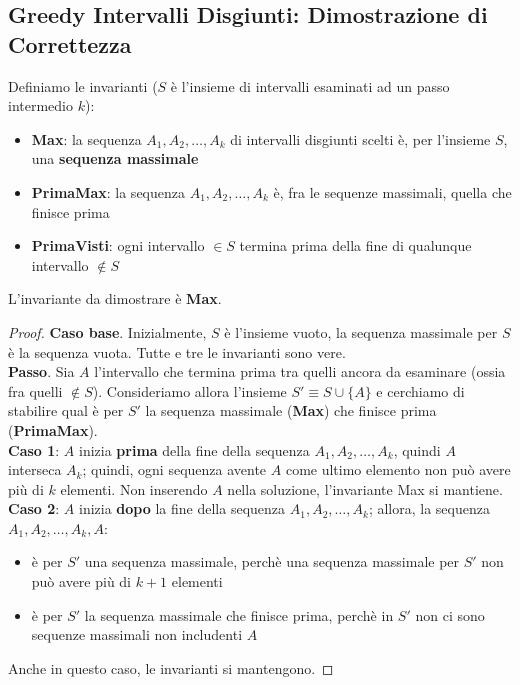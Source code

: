\documentclass[11pt]{article}
\begin{document}
\subsection*{Greedy Intervalli Disgiunti: Dimostrazione di Correttezza}
Definiamo le invarianti ($S$ è l'insieme di intervalli esaminati ad un passo intermedio $k$): 
\begin{itemize}
    \item \textbf{Max}: la sequenza $A_1,A_2,\dots,A_k$ di intervalli disgiunti scelti è, per l'insieme $S$, una \textbf{sequenza massimale}
    \item \textbf{PrimaMax}: la sequenza $A_1,A_2,\dots,A_k$ è, fra le sequenze massimali, quella che finisce prima 
    \item \textbf{PrimaVisti}: ogni intervallo $\in S$ termina prima della fine di qualunque intervallo $\notin S$
\end{itemize}
L'invariante da dimostrare è \textbf{Max}.
\begin{proof}
    \textbf{Caso base}. Inizialmente, $S$ è l'insieme vuoto, la sequenza massimale per $S$ è la sequenza vuota. Tutte e 
    tre le invarianti sono vere.\\
    \textbf{Passo}. Sia $A$ l'intervallo che termina prima tra quelli ancora da esaminare (ossia fra quelli $\notin S$).
    Consideriamo allora l'insieme $S'\equiv S \cup \{A\}$ e cerchiamo di stabilire qual è per $S'$ la sequenza massimale 
    (\textbf{Max}) che finisce prima (\textbf{PrimaMax}).\\
    \textbf{Caso 1}: $A$ inizia \textbf{prima} della fine della sequenza $A_1,A_2,\dots,A_k$, quindi $A$ interseca $A_k$; quindi, 
    ogni sequenza avente $A$ come ultimo elemento non può avere più di $k$ elementi. Non inserendo $A$ nella soluzione, 
    l'invariante Max si mantiene.\\
    \textbf{Caso 2}: $A$ inizia \textbf{dopo} la fine della sequenza $A_1,A_2,\dots,A_k$; allora, la sequenza $A_1,A_2,\dots,A_k,A$: 
    \begin{itemize}
        \item è per $S'$ una sequenza massimale, perchè una sequenza massimale per $S'$ non può avere più di $k+1$ elementi 
        \item è per $S'$ la sequenza massimale che finisce prima, perchè in $S'$ non ci sono sequenze massimali non includenti 
        $A$
    \end{itemize}
    Anche in questo caso, le invarianti si mantengono. 
\end{proof}
\end{document}
